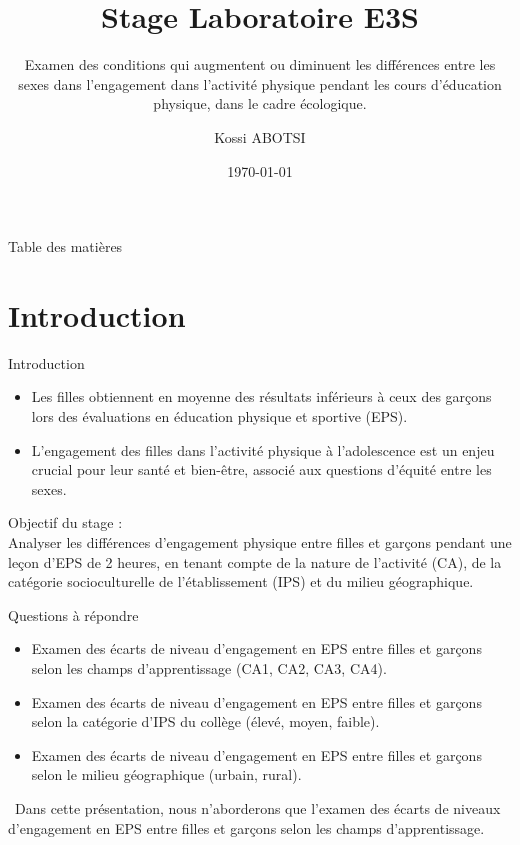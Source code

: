 \documentclass{beamer}
\title{Stage Laboratoire E3S}
\subtitle{Examen des conditions qui augmentent ou diminuent les différences entre les sexes dans l'engagement dans l'activité physique pendant les cours d'éducation physique, dans le cadre écologique.}
\author{Kossi ABOTSI}
\date{\today}
\begin{document}
	\begin{frame}[plain]
		\maketitle
	\end{frame}
	
	\begin{frame}{Table des matières}
		\tableofcontents
	\end{frame}
	
	\section{Introduction}
	\begin{frame}{Introduction}
		\begin{itemize}
			\item Les filles obtiennent en moyenne des résultats inférieurs à ceux des garçons lors des évaluations en éducation physique et sportive (EPS).
			\item L'engagement des filles dans l'activité physique à l'adolescence est un enjeu crucial pour leur santé et bien-être, associé aux questions d'équité entre les sexes.
		\end{itemize}
		
		\textcolor{mycolor}{Objectif du stage :}\\
		Analyser les différences d'engagement physique entre filles et garçons pendant une leçon d'EPS de 2 heures, en tenant compte de la nature de l'activité (CA), de la catégorie socioculturelle de l'établissement (IPS) et du milieu géographique.
	\end{frame}
	
	\begin{frame}{Questions à répondre}
		\begin{itemize}
			\item Examen des écarts de niveau d'engagement en EPS entre filles et garçons selon les champs d'apprentissage (CA1, CA2, CA3, CA4).
			\item Examen des écarts de niveau d'engagement en EPS entre filles et garçons selon la catégorie d’IPS du collège (élevé, moyen, faible).
			\item Examen des écarts de niveau d'engagement en EPS entre filles et garçons selon le milieu géographique (urbain, rural).
		\end{itemize}
		\begin{tcolorbox}[colframe=mycolor, colback=white, boxrule=1pt]
			\faExclamationTriangle \, Dans cette présentation, nous n'aborderons que l'examen des écarts de niveaux d'engagement en EPS entre filles et garçons selon les champs d'apprentissage.
		\end{tcolorbox}
	\end{frame}
	
\end{document}
